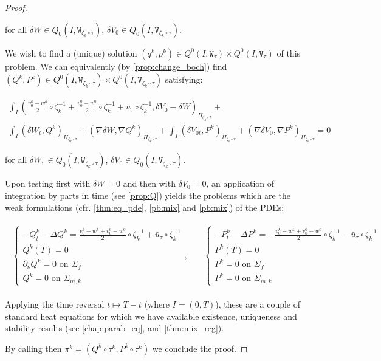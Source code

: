 \documentclass[english,a4paper,10pt,oneside]{scrbook}	%
\theoremstyle{break}
\newenvironment{mproof}[1][\proofname]{%
  \begin{proof}[#1]$ $\par\nobreak\ignorespaces
}{%
  \end{proof}
}
\renewcommand*{\proofname}{Proof}
\theoremstyle{remark}
\newcommand{\tw}[1]{\texttt{#1}}
\begin{document}
\begin{mproof}
for all $\delta W \in Q_0(I, \tw{W}_{\zeta_k \circ \tau})$, $ \delta V_{0} \in Q_0(I,\tw{V}_{\zeta_k \circ \tau})$.

We wish to find a (unique) solution $(q^k, p^k) \in Q^0(I, \tw{W}_\tau)\times Q^0(I, \tw{V}_\tau)$ of this problem. We can equivalently (by \cref{prop:change_boch}) find $(Q^k, P^k) \in Q^0(I, \tw{W}_{\zeta_k \circ \tau})\times Q^0(I, \tw{V}_{\zeta_k \circ \tau})$ satisfying:

\begin{align*}
\int_I \left (\frac{v_0^k-w^k}{2}\circ \zeta_k^{-1}+ \frac{v_0^0-w^0}{2}\circ \zeta_k^{-1}+\bar{u}_\tau\circ \zeta_k^{-1} ,\delta V_0-\delta W\right)_{H_{\zeta_k \circ \tau}}+\\
\int_I (\delta W_t ,Q^k )_{H_{\zeta_k \circ \tau}}+ (\nabla \delta W, \nabla Q^k)_{H_{\zeta_k \circ \tau}}+
\int_I( \delta V_{0t},P^k)_{H_{\zeta_k \circ \tau}} + ( \nabla \delta V_0, \nabla P^k)_{H_{\zeta_k \circ \tau}} = 0
\end{align*}

for all $\delta W, \in Q_0(I, \tw{W}_{\zeta_k \circ \tau})$, $ \delta V_{0} \in Q_0(I,\tw{V}_{\zeta_k \circ \tau})$.

Upon testing first with $\delta W=0$ and then with $\delta V_0=0$, an application of integration by parts in time (see \cref{prop:Q}) yields the problems which are the weak formulations (cfr. \cref{thm:eq_pde}, \cref{pb:mix} and \cref{pb:mix}) of the PDEs:

\begin{align*}
\begin{matrix}
\left\{\begin{matrix}
-Q^k_t-\Delta Q^k =\frac{v_0^k-w^k+v_0^0-w^0}{2}\circ \zeta_k^{-1}+\bar{u}_\tau\circ \zeta_k^{-1} \\
Q^k(T)=0\\
\partial_\nu Q^k = 0 \text{ on } \Sigma_f\\
Q^k = 0 \text{ on } \Sigma_{m,k}
\end{matrix}\right.
, \quad &
\left\{\begin{matrix}
-P^k_t-\Delta P^k =-\frac{v_0^k-w^k+v_0^0-w^0}{2}\circ \zeta_k^{-1}-\bar{u}_\tau\circ \zeta_k^{-1} \\
P^k(T)=0\\
P^k = 0 \text{ on } \Sigma_f\\
P^k = 0 \text{ on } \Sigma_{m,k}
\end{matrix}\right.
\end{matrix}
\end{align*}

Applying the time reversal $t\mapsto T -t$ (where $I = (0,T)$), these are a couple of standard heat equations for which we have available existence, uniqueness and stability results (see \cref{chap:parab_eq}, and \cref{thm:mix_reg}).

By calling then $\pi^k = (Q^k \circ \tau^k,P^k \circ \tau^k)$ we conclude the proof.
\end{mproof}
\end{document}

